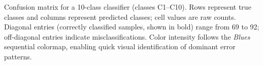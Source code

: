 \caption{Confusion matrix for a 10-class classifier (classes C1–C10). Rows represent true classes and columns represent predicted classes; cell values are raw counts. Diagonal entries (correctly classified samples, shown in bold) range from 69 to 92; off-diagonal entries indicate misclassifications. Color intensity follows the \textit{Blues} sequential colormap, enabling quick visual identification of dominant error patterns.}
